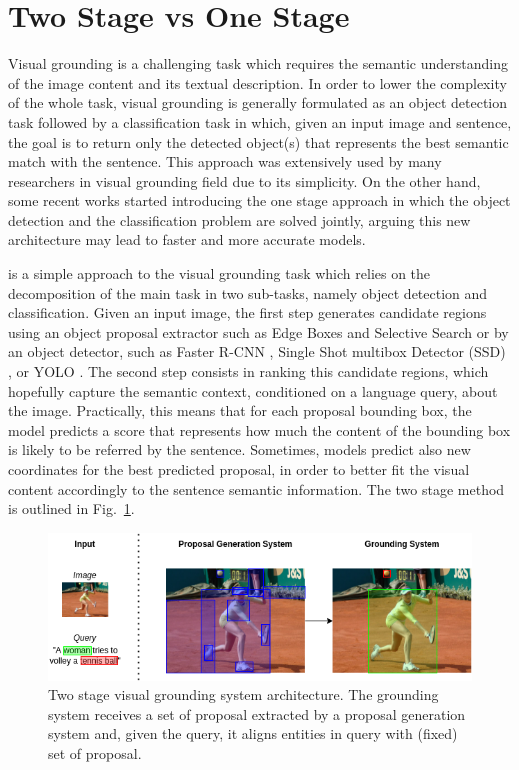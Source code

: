 \section{Two Stage vs One Stage}
\label{sec:two-stage-vs-one-stage}

Visual grounding is a challenging task which requires the semantic
understanding of the image content and its textual description. In
order to lower the complexity of the whole task, visual grounding is
generally formulated as an object detection task followed by a
classification task in which, given an input image and sentence, the
goal is to return only the detected object(s) that represents the best
semantic match with the sentence. This approach was extensively used
by many researchers in visual grounding field
\cite{rohrbach2016grounding, xiao2017weakly, akbari2019multi, chen2018knowledge, datta2019align2ground, wang2020maf}
due to its simplicity. On the other hand, some recent works started
introducing the one stage approach \cite{yang2019fast,sadhu2019zero}
in which the object detection and the classification problem are
solved jointly, arguing this new architecture may lead to faster and
more accurate models.

 is a simple approach to the visual
grounding task which relies on the decomposition of the main task in
two sub-tasks, namely object detection and classification. Given an
input image, the first step generates candidate regions using an
object proposal extractor such as Edge Boxes \cite{zitnick2014edge}
and Selective Search \cite{uijlings2013selective} or by an object
detector, such as Faster R-CNN \cite{girshick2014rich}, Single Shot
multibox Detector (SSD) \cite{liu2016ssd}, or YOLO
\cite{redmon2016you}. The second step consists in ranking this
candidate regions, which hopefully capture the semantic context,
conditioned on a language query, about the image. Practically, this
means that for each proposal bounding box, the model predicts a score
that represents how much the content of the bounding box is likely to
be referred by the sentence. Sometimes, models predict also new
coordinates for the best predicted proposal, in order to better fit
the visual content accordingly to the sentence semantic information.
The two stage method is outlined in Fig.~\ref{fig:two-stage-approach}.

\begin{figure}
  \centering
  \includegraphics[width=.8\textwidth]{figures/two-stage-approach.png}
  \caption[Two stage visual grounding system architecture]{
    Two stage visual grounding system architecture. The grounding
    system receives a set of proposal extracted by a proposal
    generation system and, given the query, it aligns entities in
    query with (fixed) set of proposal. }
  \label{fig:two-stage-approach}
\end{figure}

